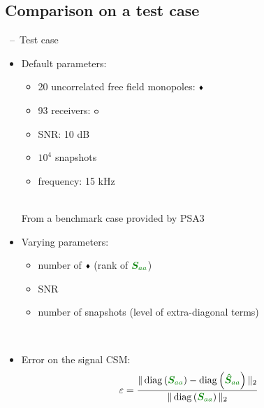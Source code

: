\documentclass[10pt,xcolor=x11names,compress, notes=show]{beamer}%
\newcommand{\diag}[1]{\operatorname{diag}\left(#1\right)}
\begin{document}
\subsection{Comparison on a test case}
\begin{frame}{\insertsectionhead~--~Test case}
	
	\begin{itemize}
	\item Default parameters:
		\noindent\begin{minipage}{1.1\linewidth}
		     	\begin{minipage}{0.4\linewidth}		     		
	         			\begin{itemize}
					\item 20  uncorrelated free field monopoles: \textcolor{red}{$\vcenter{\hbox{\tiny$\blacklozenge$}}$}
					\item 93 receivers: \textcolor{colorAlice}{$\vcenter{\hbox{\small$\bm{\circ}$}}$}
					\item SNR: 10 dB
					\item $10^4$ snapshots
					\item frequency: 15 kHz
				\end{itemize}	
	               		\vfill
	     		\end{minipage}
	      		\hspace{0.5cm}
	     		 \begin{minipage}{0.5\linewidth}
             			\centering
             			\vspace{-0.5cm}
				\\
				{\scriptsize \textcolor{black!50}{\hspace{0.5cm} From a benchmark case provided by PSA3}\vspace{-1cm}
}
	      		\end{minipage}
		\end{minipage}
	
	\item Varying parameters: \\
	\begin{itemize}
	        \item number of   \textcolor{red}{$\vcenter{\hbox{\tiny$\blacklozenge$}}$} (rank of $\textcolor{green}{\bm{S}_{aa}}$)\\[3pt]
	        \item SNR\\[3pt]
	        \item number of snapshots (level of extra-diagonal terms)
\end{itemize}~\\	
	
	\item Error on the signal CSM:
	\begin{equation*}
   		 \varepsilon = \frac{\|\diag{\textcolor{green}{\bm{S}_{aa}}}  - \diag{\textcolor{green}{\bm{\hat{S}}_{aa}}}\|_2}{\|\diag{\textcolor{green}{\bm{S}_{aa} }} \|_2}
	\end{equation*}
	\end{itemize}

\end{frame}
\end{document}
